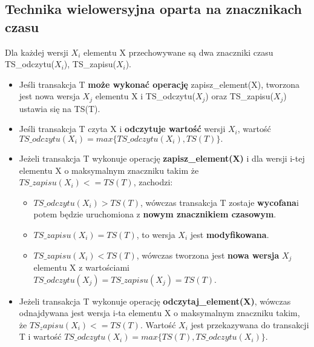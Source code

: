 \documentclass[a4paper]{article}
\begin{document}
\subsection{Technika wielowersyjna oparta na znacznikach czasu}

Dla każdej wersji $X_i$ elementu X przechowywane są dwa znaczniki czasu TS\_odczytu($X_i$), TS\_zapisu($X_i$).

\begin{itemize}
    \item Jeśli transakcja T \textbf{może wykonać operację} zapisz\_element(X), tworzona jest nowa wersja $X_j$ elementu X i TS\_odczytu($X_j$) oraz TS\_zapisu($X_j$) ustawia się na TS(T).
    \item Jeśli transakcja T czyta X i \textbf{odczytuje wartość} wersji $X_i$, wartość $TS\_odczytu(X_i) = max \{TS\_odczytu(X_i), TS(T)\}.$
    \item Jeżeli transakcja T wykonuje operację \textbf{zapisz\_element(X)} i dla wersji i-tej elementu X o maksymalnym znaczniku takim że $TS\_zapisu(X_i) <= TS(T)$, zachodzi:
    \begin{itemize}
        \item $TS\_odczytu(X_i) > TS(T)$, wówczas transakcja T zostaje \textbf{wycofana}i potem będzie uruchomiona z \textbf{nowym znacznikiem czasowym}.
        \item $TS\_zapisu(X_i) = TS(T)$, to wersja $X_i$ jest \textbf{modyfikowana}.
        \item $TS\_zapisu(X_i) < TS(T)$, wówczas tworzona jest \textbf{nowa wersja} $X_j$ elementu X z wartościami $TS\_odczytu(X_j) = TS\_zapisu(X_j) = TS(T)$. 
    \end{itemize} 
    \item  Jeżeli transakcja T wykonuje operację \textbf{odczytaj\_element(X)}, wówczas odnajdywana jest wersja i-ta elementu X o maksymalnym znaczniku takim, że $TS_zapisu(X_i) <= TS(T)$. Wartość $X_i$ jest przekazywana do transakcji T i wartość $TS\_odczytu(X_i) = max\{TS(T), TS\_odczytu(X_i)\}$.
\end{itemize}
\end{document}
